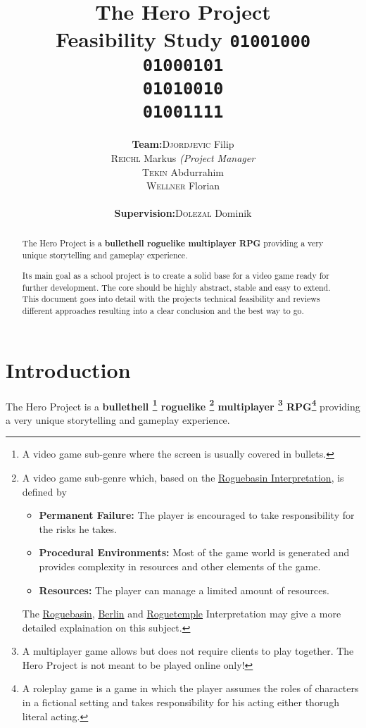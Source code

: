 \documentclass[11pt]{article}
\title{
  \textbf{The Hero Project}\\
  \large{Feasibility Study}
  \linebreak
  \linebreak
  \small{\texttt{01001000\\01000101\\01010010\\01001111}}
}
\author{
  \begin{tabular}{rl}
    \textbf{Team:}
    & \textsc{Djordjevic} Filip\\
    & \textsc{Reichl} Markus \small{\textit{(Project Manager}}\\
    & \textsc{Tekin} Abdurrahim\\
    & \textsc{Wellner} Florian\\
    \\
    \textbf{Supervision:}
    & \textsc{Dolezal} Dominik
  \end{tabular}
}
\begin{document}
\begin{titlepage}
  \clearpage
  \maketitle
  \thispagestyle{empty}
  
  \begin{abstract}
    \begin{flushleft}
      The Hero Project is a \textbf{bullethell roguelike multiplayer RPG} providing a very unique storytelling and gameplay experience.
      
      Its main goal as a school project is to create a solid base for a video game ready for further development. The core should be highly abstract, stable and easy to extend.
      \linebreak
      \linebreak
      This document goes into detail with the projects technical feasibility and reviews different approaches resulting into a clear conclusion and the best way to go.
     \end{flushleft}
  \end{abstract}
\end{titlepage}

\tableofcontents
\newpage

\section{Introduction}
The Hero Project is a \textbf{
  bullethell
  \footnote{A video game sub-genre where the screen is usually covered in bullets.}
  roguelike
  \footnote{A video game sub-genre which, based on the \href{http://roguebasin.com/roguelike-definition}{Roguebasin Interpretation}, is defined by 
    \begin{itemize}
      \item \textbf{Permanent Failure:} The player is encouraged to take responsibility for the risks he takes.
      \item \textbf{Procedural Environments:} Most of the game world is generated and provides complexity in resources and other elements of the game.
      \item \textbf{Resources:} The player can manage a limited amount of resources.
    \end{itemize}
    The \href{http://roguebasin.com/roguelike-definition}{Roguebasin}, \href{http://roguebasin.com/index.php?title=Berlin_Interpretation}{Berlin} and \href{http://roguetemple.com/roguelike-definition}{Roguetemple} Interpretation may give a more detailed explaination on this subject.
  }
  multiplayer
  \footnote{A multiplayer game allows but does not require clients to play together. The Hero Project is not meant to be played online only!}
  RPG\footnote{A roleplay game is a game in which the player assumes the roles of characters in a fictional setting and takes responsibility for his acting either thorugh literal acting.}
} providing a very unique storytelling and gameplay experience.
\end{document}

